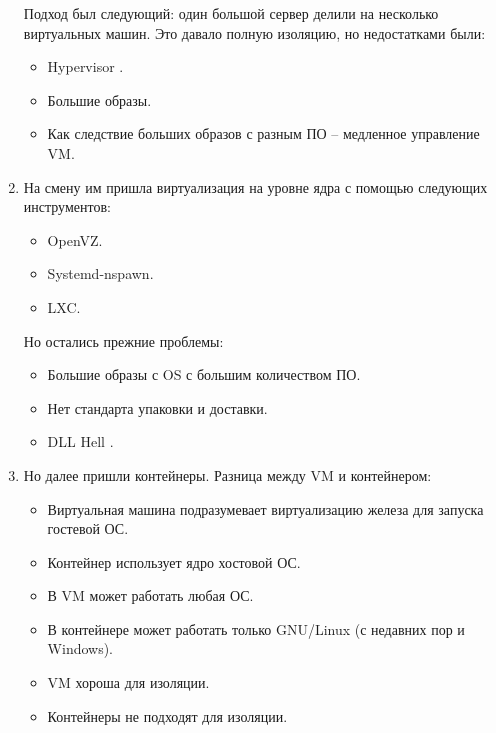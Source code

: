\begin{enumerate}
        Подход был следующий: один большой сервер делили на несколько виртуальных машин. Это давало полную изоляцию, но недостатками были:
        \begin{itemize}
            \item Hypervisor \cite{wiki:hypervisor}.
            \item Большие образы.
            \item Как следствие больших образов с разным ПО -- медленное управление VM.
        \end{itemize}
    \item На смену им пришла виртуализация на уровне ядра с помощью следующих инструментов:
        \begin{itemize}
            \item OpenVZ.
            \item Systemd-nspawn.
            \item LXC.
        \end{itemize}

        Но остались прежние проблемы:
        \begin{itemize}
            \item Большие образы с OS с большим количеством ПО.
            \item Нет стандарта упаковки и доставки.
            \item DLL Hell \cite{dick2018dll}.
        \end{itemize}
    \item Но далее пришли контейнеры. Разница между VM и контейнером:
        \begin{itemize}
            \item Виртуальная машина подразумевает виртуализацию железа для запуска гостевой ОС.
            \item Контейнер использует ядро хостовой ОС.
            \item В VM может работать любая ОС.
            \item В контейнере может работать только GNU/Linux (с недавних пор и Windows).
            \item VM хороша для изоляции.
            \item Контейнеры не подходят для изоляции.
        \end{itemize}


\end{enumerate}
